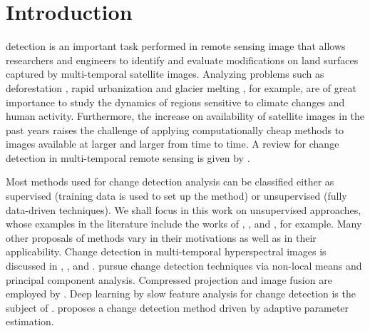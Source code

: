 \documentclass[journal]{IEEEtran}
\begin{document}
%
\IEEEpeerreviewmaketitle



\section{Introduction}
% 
% 
% 
% 

 detection is an important task performed in remote sensing image that allows researchers and engineers to identify and evaluate modifications on land surfaces captured by multi-temporal satellite images. Analyzing problems such as deforestation \cite{barreto2016deforestation}, rapid urbanization \cite{ban2012multitemporal} and glacier melting \cite{scher2021mapping}, for example, are of great importance to study the dynamics of regions sensitive to climate changes and human activity. Furthermore, the increase on availability of satellite images in the past years raises the challenge of applying computationally cheap methods to images available at larger and larger from time to time. A review for change detection in multi-temporal remote sensing is given by \cite{ban2016change}.

Most methods used for change detection analysis can be classified either as supervised (training data is used to set up the method) or unsupervised (fully data-driven techniques). We shall focus in this work on unsupervised approaches, whose examples in the literature include the works of \cite{bruzzone2000automatic}, \cite{celik2010change}, \cite{quin2014mimosa} and \cite{saha2020change}, for example. Many other proposals of methods vary in their motivations as well as in their applicability.  Change detection in multi-temporal hyperspectral images is discussed in \cite{bovolo2015time},  \cite{liu2019review}, and \cite{matsunaga2017current}.  \cite{jia2018novel} pursue change detection techniques via non-local means and principal component analysis. Compressed projection and image fusion are employed by \cite{hou2014unsupervised}. Deep learning by slow feature analysis for change detection is the subject of \cite{du2019unsupervised}. \cite{chen2020change} proposes a change detection method driven by adaptive parameter estimation.
\end{document}
